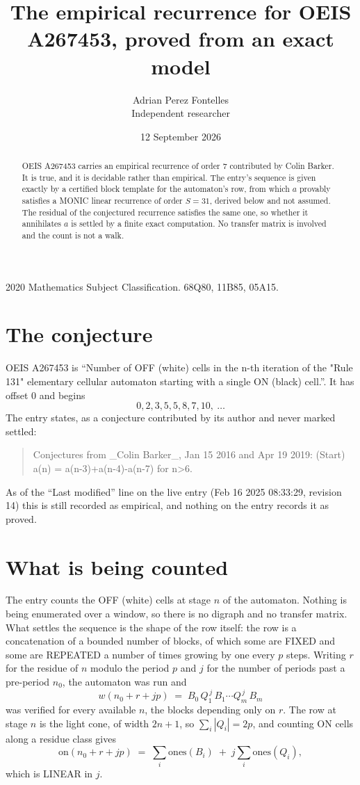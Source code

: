 \documentclass[11pt,a4paper]{article}
\title{The empirical recurrence for OEIS A267453, proved from an exact model}
\author{Adrian Perez Fontelles\\ \small Independent researcher}
\date{12 September 2026}
\theoremstyle{plain}
\theoremstyle{definition}
\begin{document}
\maketitle

\begin{abstract}
OEIS A267453 carries an empirical recurrence of order $7$ contributed by Colin Barker. It is true, and it is
decidable rather than empirical. The entry's sequence is given exactly by a certified block template for the automaton's row, from
which $a$ provably satisfies a MONIC linear recurrence of order $S=31$, derived below and not
assumed. The residual of the conjectured recurrence satisfies the same one, so whether it
annihilates $a$ is settled by a finite exact computation. No transfer matrix is involved and
the count is not a walk.
\end{abstract}

\noindent\small 2020 Mathematics Subject Classification. 68Q80, 11B85, 05A15.\normalsize

\section{The conjecture}

OEIS A267453 is ``Number of OFF (white) cells in the n-th iteration of the "Rule 131" elementary cellular automaton starting with a single ON (black) cell.''. It has offset $0$ and begins
\[
0, 2, 3, 5, 5, 8, 7, 10,\ \dots
\]
The entry states, as a conjecture contributed by its author and never marked settled:
\begin{quote}
Conjectures from \_Colin Barker\_, Jan 15 2016 and Apr 19 2019: (Start) a(n) = a(n-3)+a(n-4)-a(n-7) for n>6.
\end{quote}
As of the ``Last modified'' line on the live entry (Feb 16 2025 08:33:29, revision 14)
this is still recorded as empirical, and nothing on the entry records it as proved.

\section{What is being counted}

The entry counts the OFF (white) cells at stage $n$ of the automaton. Nothing is being enumerated over a window, so there is
no digraph and no transfer matrix. What settles the sequence is the shape of the row itself:
the row is a concatenation of a bounded number of blocks, of which some are
FIXED and some are REPEATED a number of times growing by one every $p$ steps. Writing $r$ for
the residue of $n$ modulo the period $p$ and $j$ for the number of periods past a pre-period
$n_0$, the automaton was run and
\[
w(n_0 + r + jp)\;=\;B_0\,Q_1^{\,j}\,B_1\cdots Q_m^{\,j}\,B_m
\]
was verified for every available $n$, the blocks depending only on $r$. The
row at stage $n$ is the light cone, of width $2n+1$, so $\sum_i|Q_i|=2p$, and counting ON
cells along a residue class gives
\[
\mathrm{on}(n_0+r+jp)\;=\;\sum_i \mathrm{ones}(B_i)\;+\;j\sum_i \mathrm{ones}(Q_i),
\]
which is LINEAR in $j$.
\end{document}

